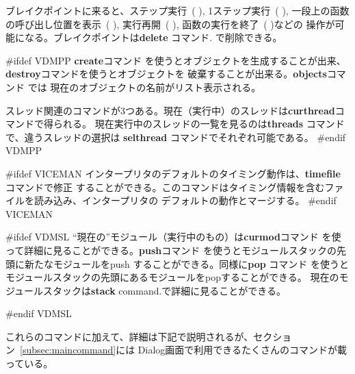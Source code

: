 \documentclass[\pformat,12pt]{article}
\newcommand{\guicmd}[1]{{\sf #1}}
\newcommand{\guicmd}[1]{{\gt #1}}
\begin{document}
ブレイクポイントに来ると、\guicmd{ステップ実行}~(\hspace{-1.8mm}
),
\guicmd{1ステップ実行}~(\hspace{-1.8mm} 
),
\guicmd{一段上の函数の呼び出し位置を表示}~(\hspace{-1.8mm}
),
\guicmd{実行再開}~(\hspace{-1.8mm}
),
\guicmd{函数の実行を終了}~(\hspace{-1.8mm} 
)などの
操作が可能になる。ブレイクポイントは\textbf{delete} コマンド.
で削除できる。

#ifdef VDMPP
\textbf{create}コマンド を使うとオブジェクトを生成することが出来、
\textbf{destroy}コマンドを使うとオブジェクトを
破棄することが出来る。\textbf{objects}コマンド では
現在のオブジェクトの名前がリスト表示される。

スレッド関連のコマンドが3つある。現在（実行中）のスレッドは\textbf{curthread}コマンドで得られる。
現在実行中のスレッドの一覧を見るのは\textbf{threads} コマンドで、違うスレッドの選択は
\textbf{selthread} コマンドでそれぞれ可能である。
#endif VDMPP

#ifdef VICEMAN
インタープリタのデフォルトのタイミング動作は、\textbf{timefile} コマンドで修正
することができる。このコマンドはタイミング情報を含むファイルを読み込み、インタープリタの
デフォルトの動作とマージする。
#endif VICEMAN

#ifdef VDMSL
  ``現在の''モジュール（実行中のもの）は\textbf{curmod}コマンド 
  を使って詳細に見ることができる。\textbf{push}コマンド 
  を使うとモジュールスタックの先頭に新たなモジュールをpush
  することができる。同様に\textbf{pop} コマンド 
  を使うとモジュールスタックの先頭にあるモジュールをpopすることができる。
  現在のモジュールスタックは\textbf{stack} command.で詳細に見ることができる。
  
#endif VDMSL

これらのコマンドに加えて、詳細は下記で説明されるが、セクション~\ref{subsec:maincommand}には
\guicmd{Dialog}画面で利用できるたくさんのコマンドが載っている。
\end{document}

